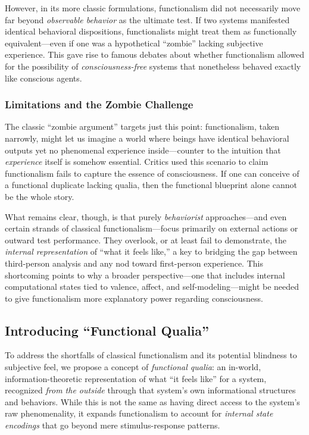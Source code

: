 \documentclass[12pt,letterpaper]{article}
\begin{document}
However, in its more classic formulations, functionalism did not necessarily move far beyond \textit{observable behavior} as the ultimate test. If two systems manifested identical behavioral dispositions, functionalists might treat them as functionally equivalent---even if one was a hypothetical ``zombie'' lacking subjective experience. This gave rise to famous debates about whether functionalism allowed for the possibility of \textit{consciousness-free} systems that nonetheless behaved exactly like conscious agents.

\subsubsection{Limitations and the Zombie Challenge}

The classic ``zombie argument'' targets just this point: functionalism, taken narrowly, might let us imagine a world where beings have identical behavioral outputs yet no phenomenal experience inside---counter to the intuition that \textit{experience} itself is somehow essential. Critics used this scenario to claim functionalism fails to capture the essence of consciousness. If one can conceive of a functional duplicate lacking qualia, then the functional blueprint alone cannot be the whole story.

What remains clear, though, is that purely \textit{behaviorist} approaches---and even certain strands of classical functionalism---focus primarily on external actions or outward test performance. They overlook, or at least fail to demonstrate, the \textit{internal representation} of ``what it feels like,'' a key to bridging the gap between third-person analysis and any nod toward first-person experience. This shortcoming points to why a broader perspective---one that includes internal computational states tied to valence, affect, and self-modeling---might be needed to give functionalism more explanatory power regarding consciousness.

\subsection{Introducing ``Functional Qualia''}

To address the shortfalls of classical functionalism and its potential blindness to subjective feel, we propose a concept of \textit{functional qualia}: an in-world, information-theoretic representation of what ``it feels like'' for a system, recognized \textit{from the outside} through that system's own informational structures and behaviors. While this is not the same as having direct access to the system's raw phenomenality, it expands functionalism to account for \textit{internal state encodings} that go beyond mere stimulus-response patterns.
\end{document}
